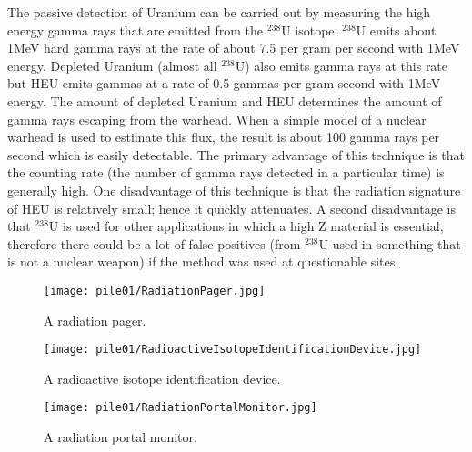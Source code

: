 \documentclass[twoside,titlepage,11pt,twocolumn,a4paper]{article}
\begin{document}
The passive detection of Uranium can be carried out by measuring the
high energy gamma rays that are emitted from the \( \mathrm{^{238}U}
\) isotope. \( \mathrm{^{238}U} \) emits about 1MeV hard gamma rays at
the rate of about 7.5 per gram per second with 1MeV
energy. \citep{drell1993} Depleted Uranium (almost all \(
\mathrm{^{238}U} \)) also emits gamma rays at this rate but HEU emits
gammas at a rate of 0.5 gammas per gram-second with 1MeV energy. The
amount of depleted Uranium and HEU determines the amount of gamma rays
escaping from the warhead. When a simple model of a nuclear warhead is
used to estimate this flux, the result is about 100 gamma rays per
second which is easily detectable.  \citep{drell1993} The primary
advantage of this technique is that the counting rate (the number of
gamma rays detected in a particular time) is generally high. One
disadvantage of this technique is that the radiation signature of HEU
is relatively small; hence it quickly
attenuates. \citep{nuclearMatDet} A second disadvantage is that \(
\mathrm{^{238}U} \) is used for other applications in which a high Z
material is essential, therefore there could be a lot of false
positives (from \( \mathrm{^{238}U} \) used in something that is not a
nuclear weapon) if the method was used at questionable sites.

\begin{figure}
  \texttt{[image: pile01/RadiationPager.jpg]}
  \caption{A radiation pager.}
\end{figure}
\begin{figure}
  \texttt{[image: pile01/RadioactiveIsotopeIdentificationDevice.jpg]}
  \caption{A radioactive isotope identification device.}
\end{figure}
\begin{figure}
  \texttt{[image: pile01/RadiationPortalMonitor.jpg]}
  \caption{A radiation portal monitor.}
\end{figure}
\end{document}

